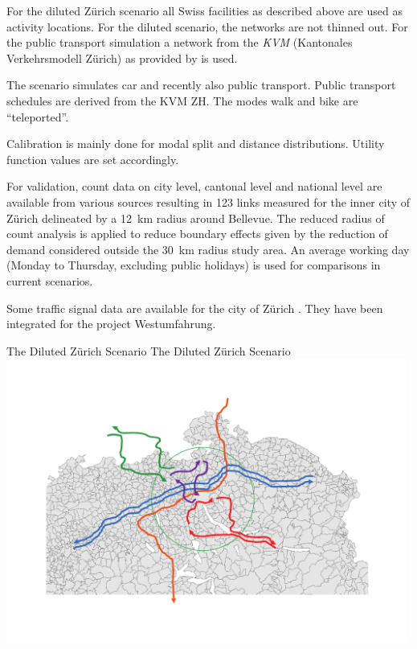 For the diluted Zürich scenario all Swiss facilities as described above are used as activity locations. For the diluted scenario, the networks are not thinned out. For the public transport simulation a network from the \emph{KVM} (Kantonales Verkehrsmodell Zürich) as provided by \citet[][]{AMV_Webpage_2011} is used. 

The scenario simulates car and recently also public transport. Public transport schedules are derived from the KVM ZH. The modes walk and bike are ``teleported''. 

Calibration is mainly done for modal split and distance distributions. Utility function values are set accordingly.

For validation, count data on city level, cantonal level and national level \citep[][]{ASTRA_Webpage_2006} are available from various sources resulting in 123 links measured for the inner city of Zürich delineated by a 12~km radius around Bellevue. The reduced radius of count analysis is applied to reduce boundary effects given by the reduction of demand considered outside the 30~km radius study area. An average working day (Monday to Thursday, excluding public holidays) is used for comparisons in current scenarios.

Some traffic signal data are available for the city of Zürich \citep[][]{STAPOZH-DAV_unpub_gtZH_2008}. They have been integrated for the project Westumfahrung.

\createfigure%
{The Diluted Zürich Scenario}%
{The Diluted Zürich Scenario}%
{\label{fig:zurichScenario}}%
{\includegraphics[width=0.99\textwidth, angle=0]{using/figures/zh.pdf}}%
{}

